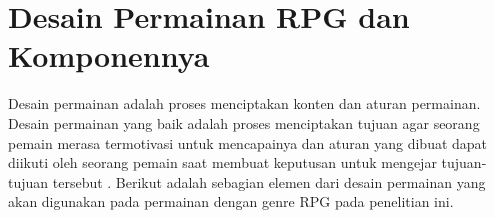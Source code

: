 \section{Desain Permainan RPG dan Komponennya}
\label{sec:sec2_gdd}
\vspace{1ex}

Desain permainan adalah proses menciptakan konten dan aturan permainan. Desain permainan yang baik adalah proses menciptakan tujuan agar seorang pemain merasa termotivasi untuk mencapainya dan aturan yang dibuat dapat diikuti oleh seorang pemain saat membuat keputusan untuk mengejar tujuan-tujuan tersebut \citep{Brathwaite2009}. Berikut adalah sebagian elemen dari desain permainan yang akan digunakan pada permainan dengan genre RPG pada penelitian ini.
\vspace{1ex}

